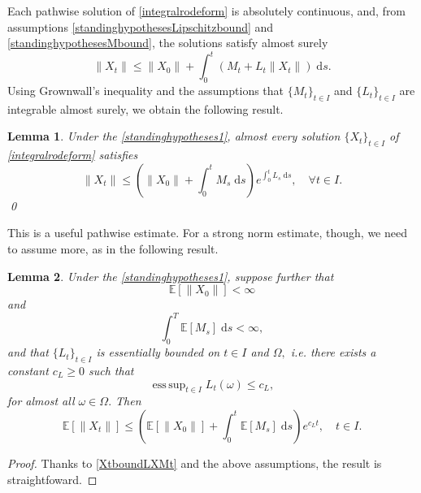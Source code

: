 \documentclass[reqno,12pt]{amsart}
\theoremstyle{plain} %
\newtheorem{lemma}{Lemma}[section]
\theoremstyle{definition} %
\begin{document}
Each pathwise solution of \eqref{integralrodeform} is absolutely continuous, and, from assumptions \eqref{standinghypothesesLipschitzbound} and \eqref{standinghypothesesMbound}, the solutions satisfy almost surely
\[
    \|X_t\| \leq \|X_0\| + \int_0^t (M_t + L_t\|X_t\|)\;\mathrm{d}s.
\]
Using Grownwall's inequality and the assumptions that $\{M_t\}_{t\in I}$ and $\{L_t\}_{t\in I}$ are integrable almost surely, we obtain the following result.
\begin{lemma}
    Under the \cref{standinghypotheses1}, almost every solution $\{X_t\}_{t\in I}$ of \eqref{integralrodeform} satisfies
    \begin{equation}
        \label{XtboundLXMt}
        \|X_t\| \leq \left(\|X_0\| + \int_0^t M_s\;\mathrm{d}s\right) e^{\int_0^t L_s\;\mathrm{d}s}, \quad \forall t\in I.
    \end{equation}
    \qed
\end{lemma}

This is a useful pathwise estimate. For a strong norm estimate, though, we need to assume more, as in the following result.
\begin{lemma}
    Under the \cref{standinghypotheses1}, suppose further that
    \begin{equation}
        \label{EX0strongbound}
        \mathbb{E}[\|X_0\|] < \infty
    \end{equation}
    and
    \begin{equation}
        \label{EMtstrongbound}
        \int_0^T \mathbb{E}[M_s] \;\mathrm{d}s < \infty,
    \end{equation}
    and that $\{L_t\}_{t\in I}$ is essentially bounded on $t\in I$ and $\Omega,$ i.e. there exists a constant $c_L \geq 0$ such that
    \begin{equation}
        \label{LtLXbound}
        \operatorname{ess\,sup}_{t\in I} L_t(\omega) \leq c_L,
    \end{equation}
    for almost all $\omega\in \Omega.$ Then
    \begin{equation}
        \label{EXtstrongbound}
        \mathbb{E}[\|X_t\|] \leq \left(\mathbb{E}[\|X_0\|] + \int_0^t \mathbb{E}[M_s]\;\mathrm{d}s\right) e^{c_L t}, \quad t\in I.
    \end{equation}
\end{lemma}

\begin{proof}
    Thanks to \eqref{XtboundLXMt} and the above assumptions, the result is straightfoward.
\end{proof}
\end{document}
